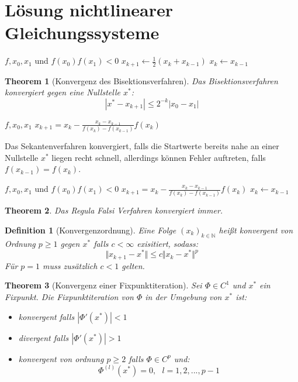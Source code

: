 \documentclass[10pt,a4paper]{article}
\newtheorem{theorem}{Theorem}
\newtheorem{definition}{Definition}
\begin{document}
	\section{Lösung nichtlinearer Gleichungssysteme}
	\begin{algorithm}
		\caption{Bisektionsverfahren}
		\begin{algorithmic}
			\Require $f, x_0, x_1$ und $f(x_0)f(x_1) < 0$
			\State $x_{k+1} \leftarrow \frac{1}{2}(x_k + x_{k-1})$
			\State $x_k \leftarrow x_{k-1}$
			\EndIf
			\EndFor 
		\end{algorithmic}
	\end{algorithm}
	\begin{theorem}[Konvergenz des Bisektionsverfahren]
		Das Bisektionsverfahren konvergiert gegen eine Nullstelle $x^*$:
		$$|x^* - x_{k+1}| \leq 2^{-k}|x_0-x_1|$$
	\end{theorem}
	\begin{algorithm}
		\caption{Sekantenverfahren}
		\begin{algorithmic}
			\Require $f, x_0, x_1$
			\For{$k=1, 2, ...$}
			\State $x_{k+1} = x_k - \frac{x_k-x_{k-1}}{f(x_k)- f(x_{k-1})}f(x_k)$
			\EndFor 
		\end{algorithmic}
	\end{algorithm}
	Das Sekantenverfahren konvergiert, falls die Startwerte bereits nahe an einer Nullstelle $x^*$ liegen recht schnell, allerdings können Fehler auftreten, falls $f(x_{k-1}) = f(x_k)$.
	\begin{algorithm}
		\caption{Regula Falsi}
		\begin{algorithmic}
			\Require $f, x_0, x_1$ und $f(x_0)f(x_1) < 0$
			\For{$k=1, 2, ...$}
			\State $x_{k+1} = x_k - \frac{x_k-x_{k-1}}{f(x_k)- f(x_{k-1})}f(x_k)$
			\If{$f(x_{k+1})f(x_{k-1}) < 0$}
			\State $x_k \leftarrow x_{k-1}$
			\EndIf
			\EndFor
		\end{algorithmic}
	\end{algorithm}
	\begin{theorem}
		Das Regula Falsi Verfahren konvergiert immer.
	\end{theorem}
	\begin{definition}[Konvergenzordnung]
		Eine Folge $(x_k)_{k\in \mathbb{N}}$ heißt konvergent von Ordnung $p\geq 1$ gegen $x^*$ falls $c < \infty$ exisitiert, sodass:
		$$\Vert x_{k+1} - x^*\Vert \leq c\Vert x_k -x^*\Vert^p$$
		Für $p=1$ muss zusätzlich $c<1$ gelten.
	\end{definition}
	\begin{theorem}[Konvergenz einer Fixpunktiteration]
		Sei $\Phi\in C^1$ und $x^*$ ein Fixpunkt. Die Fixpunktiteration von $\Phi$ in der Umgebung von $x^*$ ist:
		\begin{itemize}
			\item konvergent falls $|\Phi'(x^*)| < 1$
			\item divergent falls $|\Phi'(x^*)| > 1$
			\item konvergent von ordnung $p \geq 2$ falls $\Phi \in C^p$ und:
			$$\Phi^{(l)}(x^*) = 0, \ \ \ l=1, 2, ..., p-1$$
		\end{itemize}
	\end{theorem}
\end{document}
